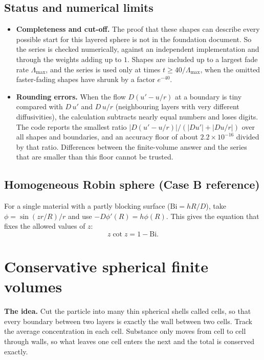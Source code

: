 \documentclass[11pt]{article}
\begin{document}
\subsection{Status and numerical limits}
\begin{itemize}
\item \textbf{Completeness and cut-off.} The proof that these shapes can describe every possible start for this layered sphere is not in the foundation document. So the series is checked numerically, against an independent implementation and through the weights adding up to $1$. Shapes are included up to a largest fade rate $\Lambda_{\max}$, and the series is used only at times $t\ge40/\Lambda_{\max}$, when the omitted faster-fading shapes have shrunk by a factor $e^{-40}$.
\item \textbf{Rounding errors.} When the flow $D(u'-u/r)$ at a boundary is tiny compared with $D\,u'$ and $D\,u/r$ (neighbouring layers with very different diffusivities), the calculation subtracts nearly equal numbers and loses digits. The code reports the smallest ratio $|D(u'-u/r)|/(|Du'|+|Du/r|)$ over all shapes and boundaries, and an accuracy floor of about $2.2\times10^{-16}$ divided by that ratio. Differences between the finite-volume answer and the series that are smaller than this floor cannot be trusted.
\end{itemize}

\subsection{Homogeneous Robin sphere (Case B reference)}\label{sec:robin}
For a single material with a partly blocking surface ($\mathrm{Bi}=hR/D$), take $\phi=\sin(zr/R)/r$ and use $-D\phi'(R)=h\phi(R)$. This gives the equation that fixes the allowed values of $z$:
\[
z\cot z=1-\mathrm{Bi}.
\]

\section{Conservative spherical finite volumes}
\textbf{The idea.} Cut the particle into many thin spherical shells called cells, so that every boundary between two layers is exactly the wall between two cells. Track the average concentration in each cell. Substance only moves from cell to cell through walls, so what leaves one cell enters the next and the total is conserved exactly.
\end{document}
